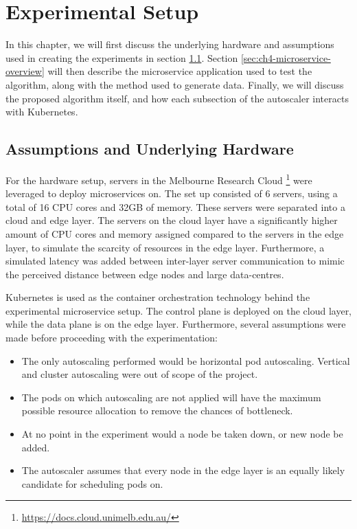 \clearpage

\def\chaptertitle{Experimental Setup}

\lhead{\emph{\chaptertitle}}

\chapter{\chaptertitle}
\label{ch:experimental-setup}

In this chapter, we will first discuss the underlying hardware and assumptions used in creating the experiments in section \ref{sec:ch4-hardware-assumptions}. Section \ref{sec:ch4-microservice-overview} will then describe the microservice application used to test the algorithm, along with the method used to generate data. Finally, we will discuss the proposed algorithm itself, and how each subsection of the autoscaler interacts with Kubernetes.

\section{Assumptions and Underlying Hardware}
\label{sec:ch4-hardware-assumptions}

For the hardware setup, servers in the Melbourne Research Cloud \footnote{\url{https://docs.cloud.unimelb.edu.au/}} were leveraged to deploy microservices on. The set up consisted of 6 servers, using a total of 16 CPU cores and 32GB of memory. These servers were separated into a cloud and edge layer. The servers on the cloud layer have a significantly higher amount of CPU cores and memory assigned compared to the servers in the edge layer, to simulate the scarcity of resources in the edge layer. Furthermore, a simulated latency was added between inter-layer server communication to mimic the perceived distance between edge nodes and large data-centres.\par

Kubernetes is used as the container orchestration technology behind the experimental microservice setup. The control plane is deployed on the cloud layer, while the data plane is on the edge layer. Furthermore, several assumptions were made before proceeding with the experimentation:

\begin{itemize}
    \item The only autoscaling performed would be horizontal pod autoscaling. Vertical and cluster autoscaling were out of scope of the project.
    \item The pods on which autoscaling are not applied will have the maximum possible resource allocation to remove the chances of bottleneck.
    \item At no point in the experiment would a node be taken down, or new node be added.
    \item The autoscaler assumes that every node in the edge layer is an equally likely candidate for scheduling pods on.
\end{itemize}

